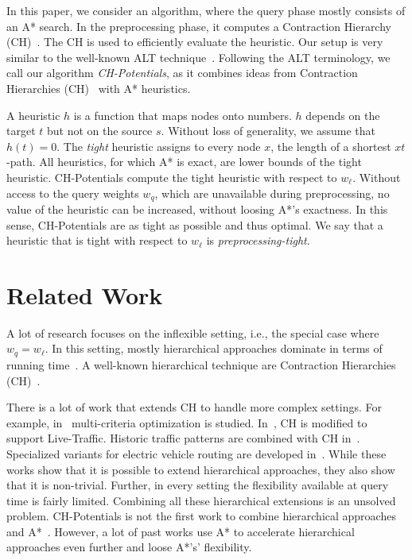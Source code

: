 \documentclass[letterpaper]{article} %
\begin{document}
In this paper, we consider an algorithm, where the query phase mostly consists of an A* search.
In the preprocessing phase, it computes a Contraction Hierarchy (CH)~\cite{gssv-erlrn-12}.
The CH is used to efficiently evaluate the heuristic.
Our setup is very similar to the well-known ALT technique~\cite{gh-cspas-05,DBLP:conf/wea/DellingW07}.
Following the ALT terminology, we call our algorithm \emph{CH-Potentials}, as it combines ideas from Contraction Hierarchies (CH)~\cite{gssv-erlrn-12} with A* heuristics.

A heuristic $h$ is a function that maps nodes onto numbers.
$h$ depends on the target $t$ but not on the source $s$.
Without loss of generality, we assume that $h(t)=0$.
The \emph{tight} heuristic assigns to every node $x$, the length of a shortest $xt$-path.
All heuristics, for which A* is exact, are lower bounds of the tight heuristic.
CH-Potentials compute the tight heuristic with respect to $w_\ell$.
Without access to the query weights $w_q$, which are unavailable during preprocessing, no value of the heuristic can be increased, without loosing A*'s exactness.
In this sense, CH-Potentials are as tight as possible and thus optimal.
We say that a heuristic that is tight with respect to $w_\ell$ is \emph{preprocessing-tight}.

\section{Related Work}

A lot of research focuses on the inflexible setting, i.e., the special case where $w_q = w_\ell$.
In this setting, mostly hierarchical approaches dominate in terms of running time~\cite{bdgmpsww-rptn-16}.
A well-known hierarchical technique are Contraction Hierarchies (CH)~\cite{gssv-erlrn-12}.

There is a lot of work that extends CH to handle more complex settings.
For example, in~\cite{fns-opca-14,gks-rpfof-10} multi-criteria optimization is studied.
In~\cite{dsw-cch-15}, CH is modified to support Live-Traffic.
Historic traffic patterns are combined with CH in~\cite{swz-sfert-19,bgsv-mtdtt-13,bdpw-dtdrp-16}.
Specialized variants for electric vehicle routing are developed in~\cite{DBLP:journals/algorithmica/BaumDPSWZ20,DBLP:conf/aaai/EisnerFS11}.
While these works show that it is possible to extend hierarchical approaches, they also show that it is non-trivial.
Further, in every setting the flexibility available at query time is fairly limited.
Combining all these hierarchical extensions is an unsolved problem.
%
CH-Potentials is not the first work to combine hierarchical approaches and A*~\cite{bdsssw-chgds-10,gkw-blwr-07,bdgwz-sfpcs-19}.
However, a lot of past works use A* to accelerate hierarchical approaches even further and loose A*'s' flexibility.
\end{document}
